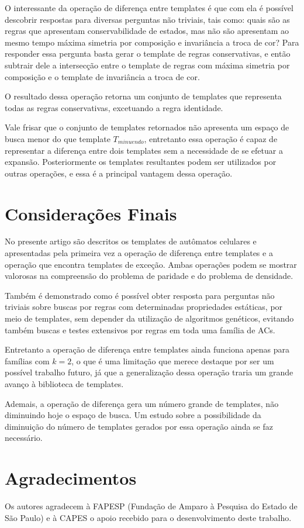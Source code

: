 \documentclass[12pt, a4paper]{article}
\begin{document}
O interessante da operação de diferença entre templates é que com ela é possível descobrir respostas para diversas perguntas não triviais, tais como: quais são as regras que apresentam conservabilidade de estados, mas não são apresentam ao mesmo tempo máxima simetria por composição e invariância a troca de cor? Para responder essa pergunta basta gerar o template de regras conservativas, e então subtrair dele a intersecção entre o template de regras com máxima simetria por composição e o template de invariância a troca de cor.

O resultado dessa operação retorna um conjunto de templates que representa todas as regras conservativas, excetuando a regra identidade.

Vale frisar que o conjunto de templates retornados não apresenta um espaço de busca menor do que template $T_{minuendo}$, entretanto essa operação é capaz de representar a diferença entre dois templates sem a necessidade de se efetuar a expansão. Posteriormente os templates resultantes podem ser utilizados por outras operações, e essa é a principal vantagem dessa operação. 









\section{Considerações Finais}
\label{sec:consideracoes_finais}
No presente artigo são descritos os templates de autômatos celulares e apresentadas pela primeira vez a operação de diferença entre templates e a operação que encontra templates de exceção. Ambas operações podem se mostrar valorosas na compreensão do problema de paridade e do problema de densidade.

Também é demonstrado como é possível obter resposta para perguntas não triviais sobre buscas por regras com determinadas propriedades estáticas, por meio de templates, sem depender da utilização de algoritmos genéticos, evitando também buscas e testes extensivos por regras em toda uma família de ACs.

Entretanto a operação de diferença entre templates ainda funciona apenas para famílias com $k=2$, o que é uma limitação que merece destaque por ser um possível trabalho futuro, já que a generalização dessa operação traria um grande avanço à biblioteca de templates. 

Ademais, a operação de diferença gera um número grande de templates, não diminuindo hoje o espaço de busca. Um estudo sobre a possibilidade da diminuição do número de templates gerados por essa operação ainda se faz necessário.

\section*{Agradecimentos}
\label{sec:agrdecimentos}
Os autores agradecem à FAPESP (Fundação de Amparo à Pesquisa do Estado de São Paulo) e à CAPES o apoio recebido para o desenvolvimento deste trabalho.

\def\refname{REFERÊNCIAS BIBLIOGRÁFICAS}


\end{document}
